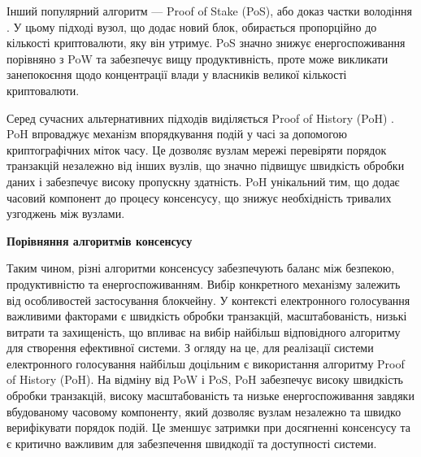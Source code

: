 \documentclass[14pt]{extreport}
\begin{document}
  Інший популярний алгоритм — Proof of Stake (PoS), або доказ частки володіння \cite{pos}. У цьому підході вузол, що додає новий блок, обирається пропорційно до кількості криптовалюти, яку він утримує. PoS значно знижує енергоспоживання порівняно з PoW та забезпечує вищу продуктивність, проте може викликати занепокоєння щодо концентрації влади у власників великої кількості криптовалюти.

  Серед сучасних альтернативних підходів виділяється Proof of History (PoH) \cite{poh}. PoH впроваджує механізм впорядкування подій у часі за допомогою криптографічних міток часу. Це дозволяє вузлам мережі перевіряти порядок транзакцій незалежно від інших вузлів, що значно підвищує швидкість обробки даних і забезпечує високу пропускну здатність. PoH унікальний тим, що додає часовий компонент до процесу консенсусу, що знижує необхідність тривалих узгоджень між вузлами.

  \begin{table}[H]
  \centering
  \renewcommand{\tablename}{Таблиця}
  \renewcommand{\thetable}{\thechapter.\arabic{table}.}
  \caption{}
  \textbf{Порівняння алгоритмів консенсусу\vspace{5pt}}
  \label{tab:consensus_comparison}
  \end{table}
  
  Таким чином, різні алгоритми консенсусу забезпечують баланс між безпекою, продуктивністю та енергоспоживанням. Вибір конкретного механізму залежить від особливостей застосування блокчейну. У контексті електронного голосування важливими факторами є швидкість обробки транзакцій, масштабованість, низькі витрати та захищеність, що впливає на вибір найбільш відповідного алгоритму для створення ефективної системи. З огляду на це, для реалізації системи електронного голосування найбільш доцільним є використання алгоритму Proof of History (PoH). На відміну від PoW і PoS, PoH забезпечує високу швидкість обробки транзакцій, високу масштабованість та низьке енергоспоживання завдяки вбудованому часовому компоненту, який дозволяє вузлам незалежно та швидко верифікувати порядок подій. Це зменшує затримки при досягненні консенсусу та є критично важливим для забезпечення швидкодії та доступності системи.
  
\end{document}
